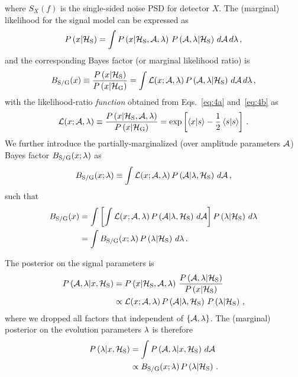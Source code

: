 \documentclass[aps,prd,onecolumn,notitlepage,nofootinbib,superscriptaddress,altaffilletter,floatfix]{revtex4-1}
\begin{document}
where $S_X(f)$ is the single-sided noise PSD for detector $X$.
The (marginal) likelihood for the signal model can be expressed as
\begin{equation}
  \label{eq:6}
  \prob{x}{\HypS} = \int \prob{x}{\HypS,\parA,\parE}\,\prob{\parA,\parE}{\HypS}\,d\parA\,d\parE\,,
\end{equation}
and the corresponding Bayes factor (or marginal likelihood ratio) is
\begin{equation}
  \label{eq:7}
  \BSG(x) \equiv \frac{\prob{x}{\HypS}}{\prob{x}{\HypG}} = \int \Lr(x;\parA,\parE)\,\prob{\parA,\parE}{\HypS}\,d\parA\,d\parE\,,
\end{equation}
with the likelihood-ratio \emph{function} obtained from Eqs.~\eqref{eq:4a} and~\eqref{eq:4b} as
\begin{equation}
  \label{eq:8}
  \Lr(x;\parA,\parE) \equiv \frac{\prob{x}{\HypS,\parA,\parE}}{\prob{x}{\HypG}} = \exp\left[\scalar{x}{s} - \frac{1}{2}\scalar{s}{s}\right]\,.
\end{equation}
We further introduce the partially-marginalized (over amplitude parameters ${\mathcal A}$) Bayes factor $B_{\mathrm{S/G}}(x;\lambda)$ as
\begin{equation}
  B_{\mathrm{S/G}}(x;\lambda) \equiv \int \mathcal{L}(x;{\mathcal A},\lambda) \, P\left({\mathcal A}\middle|\lambda,\mathcal{H}_{\mathrm{S}}\right)\,d{\mathcal A}\,,  \label{eq:23b}
\end{equation}
such that
\begin{align}
  B_{\mathrm{S/G}}(x) &= \int \left[ \int \mathcal{L}(x;{\mathcal A},\lambda)\,P\left({\mathcal A}\middle|\lambda,\mathcal{H}_{\mathrm{S}}\right)\,d{\mathcal A}\right] P\left(\lambda\middle|\mathcal{H}_{\mathrm{S}}\right) \,d\lambda \notag\\
          &= \int B_{\mathrm{S/G}}(x;\lambda) \,P\left(\lambda\middle|\mathcal{H}_{\mathrm{S}}\right)\,d\lambda\,.   \label{eq:23a}
\end{align}

The posterior on the signal parameters is
\begin{align}
  \label{eq:49}
  \prob{\parA,\parE}{x,\HypS} &= \prob{x}{\HypS,\parA,\parE}\,\frac{\prob{\parA,\parE}{\HypS}}{\prob{x}{\HypS}} \notag\\
    &\propto \Lr(x;\parA,\parE)\,\prob{\parA}{\parE,\HypS}\,\prob{\parE}{\HypS}\,,
\end{align}
where we dropped all factors that independent of $\{{\mathcal A},\lambda\}$.
The (marginal) posterior on the evolution parameters $\lambda$ is therefore
\begin{align}
  \label{eq:50}
  \prob{\parE}{x,\HypS} &= \int \prob{\parA,\parE}{x,\HypS}\,d\parA \notag\\
  &\propto \BSG(x;\parE) \,\prob{\parE}{\HypS}\,.
\end{align}
\end{document}
